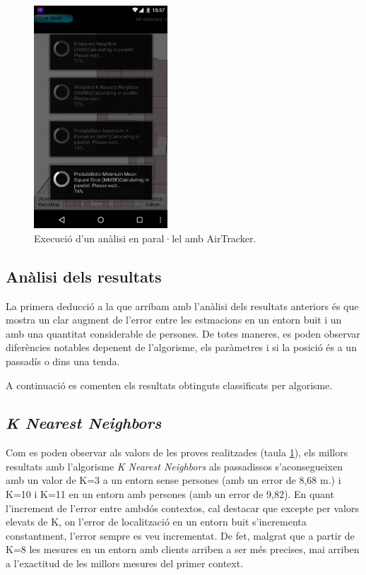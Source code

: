 \begin{figure}[ht]
\begin{center}
\includegraphics[width=5cm]{imatges/analisi_offline_paralel.png}
\caption{Execució d'un anàlisi en paral·lel amb AirTracker.}
\label{fig:analisi_offline_paralel}
\end{center}
\end{figure}

\subsection{Anàlisi dels resultats}

La primera deducció a la que arribam amb l'anàlisi dels resultats anteriors és que mostra un clar augment de l'error entre les estmacions en un entorn buit i un amb una quantitat considerable de persones. De totes maneres, es poden observar diferències notables depenent de l'algorisme, els paràmetres i si la posició és a un passadís o dins una tenda.

A continuació es comenten els resultats obtinguts classificats per algorisme.

\subsection{\textit{K Nearest Neighbors}}

Com es poden observar als valors de les proves realitzades (taula \ref{fig:analisi_offline_paralel}), els millors resultats amb l'algorisme \textit{K Nearest Neighbors} als passadissos s'aconsegueixen amb un valor de K=3 a un entorn sense persones (amb un error de 8,68 m.) i K=10 i K=11 en un entorn amb persones (amb un error de 9,82). En quant  l'increment de l'error entre ambdós contextos, cal destacar que excepte per valors elevats de K, on l'error de localització en un entorn buit s'incrementa constantment, l'error sempre es veu incrementat. De fet, malgrat que a partir de K=8 les mesures en un entorn amb clients arriben a ser més precises, mai arriben a l'exactitud de les millors mesures del primer context.

